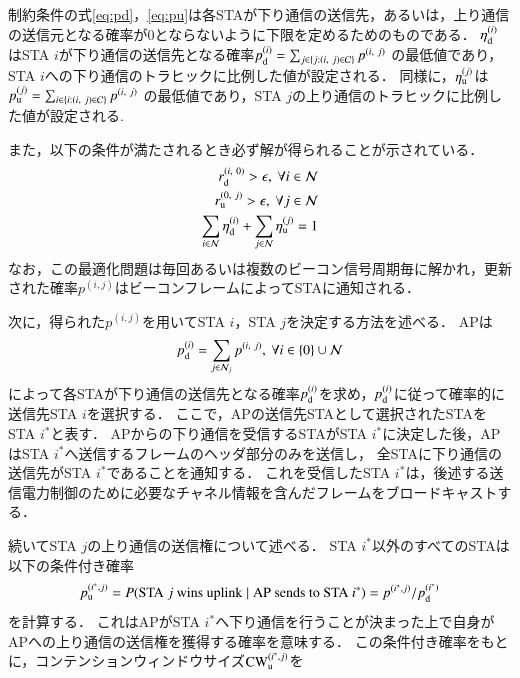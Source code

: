 \documentclass[master]{kuisthesis}		%
\newcommand{\mN}{{\mathcal N}}
\newcommand{\pij}{p^{(i,j)}}
\begin{document}
			制約条件の式\eqref{eq:pd}，\eqref{eq:pu}は各STAが下り通信の送信先，あるいは，上り通信の送信元となる確率が0とならないように下限を定めるためのものである．
			$\eta_{\rm d}^{(i)}$はSTA $i$が下り通信の送信先となる確率$p_{\rm d}^{(i)}=\sum_{j\in\{j:(i,\ j)\in{\mathcal C}\}} p^{(i,\ j)}$
			の最低値であり，STA $i$への下り通信のトラヒックに比例した値が設定される．
			同様に，$\eta_{\rm u}^{(j)}$は$p_{\rm u}^{(j)}=\sum_{i\in\{i:(i,\ j)\in{\mathcal C}\}} p^{(i,\ j)}$
			の最低値であり，STA $j$の上り通信のトラヒックに比例した値が設定される.
			\par
			また，以下の条件が満たされるとき必ず解が得られることが示されている．
			\begin{align}
				r_{\rm d}^{(i,\ 0)} >\epsilon,\ \forall i\in\mN \\
				r_{\rm u}^{(0,\ j)} >\epsilon,\ \forall j\in\mN \\
				\sum_{i\in\mN}\eta_{\rm d}^{(i)} + \sum_{j\in\mN}\eta_{\rm u}^{(j)} =1 \label{eq:feasible}
			\end{align}
			なお，この最適化問題は毎回あるいは複数のビーコン信号周期毎に解かれ，更新された確率$\pij$はビーコンフレームによってSTAに通知される．
			\par
			次に，得られた$\pij$を用いてSTA $i$，STA $j$を決定する方法を述べる．
			APは
			\begin{equation}
				p_{\rm d}^{(i)}= \sum_{j\in{\mathcal N}_j}p^{(i,\ j)},\ \forall i \in \{0\}\cup{\mathcal N}
			\end{equation}
			によって各STAが下り通信の送信先となる確率$p_{\rm d}^{(i)}$を求め，$p_{\rm d}^{(i)}$に従って確率的に送信先STA $i$を選択する．
			ここで，APの送信先STAとして選択されたSTAをSTA $i^*$と表す．
			APからの下り通信を受信するSTAがSTA $i^*$に決定した後，APはSTA $i^*$へ送信するフレームのヘッダ部分のみを送信し，
			全STAに下り通信の送信先がSTA $i^*$であることを通知する．
			これを受信したSTA $i^*$は，後述する送信電力制御のために必要なチャネル情報を含んだフレームをブロードキャストする．
			\par
			続いてSTA $j$の上り通信の送信権について述べる．
			STA $i^*$以外のすべてのSTAは以下の条件付き確率
			\begin{equation}
				p_{\rm u}^{(i^*,j)} = P({\rm STA}\ j\ {\rm wins\ uplink}\mid{\rm AP\ sends\ to}\ {\rm STA}\ i^*)=p^{(i^*,j)} / p_{\rm d}^{(i^*)} \label{eq:win}
			\end{equation}
			を計算する．
			これはAPがSTA $i^*$へ下り通信を行うことが決まった上で自身がAPへの上り通信の送信権を獲得する確率を意味する．
			この条件付き確率をもとに，コンテンションウィンドウサイズ${\rm CW}^{(i^*,j)}_{\rm u}$を
\end{document}
